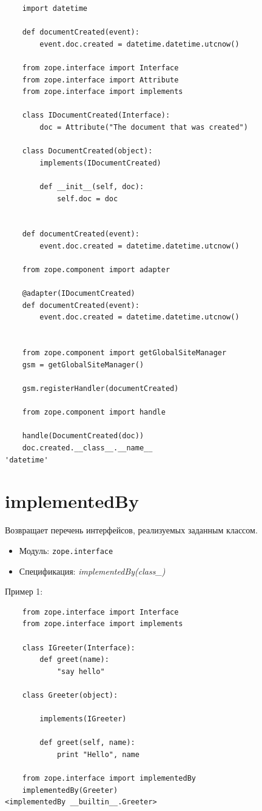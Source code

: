 \documentclass[a4paper,openany,twoside,draft]{book}
\providecommand*{\DUroletitlereference}[1]{\textsl{#1}}
\begin{document}
\begin{verbatim}
    import datetime

    def documentCreated(event):
        event.doc.created = datetime.datetime.utcnow()

    from zope.interface import Interface
    from zope.interface import Attribute
    from zope.interface import implements

    class IDocumentCreated(Interface):
        doc = Attribute("The document that was created")

    class DocumentCreated(object):
        implements(IDocumentCreated)

        def __init__(self, doc):
            self.doc = doc


    def documentCreated(event):
        event.doc.created = datetime.datetime.utcnow()

    from zope.component import adapter

    @adapter(IDocumentCreated)
    def documentCreated(event):
        event.doc.created = datetime.datetime.utcnow()


    from zope.component import getGlobalSiteManager
    gsm = getGlobalSiteManager()

    gsm.registerHandler(documentCreated)

    from zope.component import handle

    handle(DocumentCreated(doc))
    doc.created.__class__.__name__
'datetime'
\end{verbatim}


\section*{implementedBy%
  \label{implementedby}%
}

Возвращает перечень интерфейсов, реализуемых заданным классом.

\begin{itemize}

\item Модуль: \texttt{zope.interface}

\item Спецификация: \DUroletitlereference{implementedBy(class\_)}

\end{itemize}

Пример 1:

\begin{verbatim}
    from zope.interface import Interface
    from zope.interface import implements

    class IGreeter(Interface):
        def greet(name):
            "say hello"

    class Greeter(object):

        implements(IGreeter)

        def greet(self, name):
            print "Hello", name

    from zope.interface import implementedBy
    implementedBy(Greeter)
<implementedBy __builtin__.Greeter>
\end{verbatim}
\end{document}
